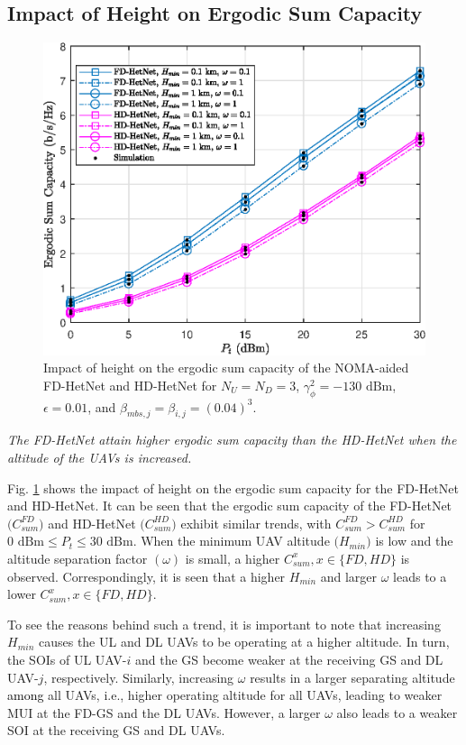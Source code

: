 \subsection{Impact of Height on Ergodic Sum Capacity}

\begin{figure}[h]
\centering \vspace{0.1cm}
\includegraphics [width=0.45\columnwidth]{chap7_fig/height_impact_sum_capacity.eps}
\caption{Impact of height on the ergodic sum capacity of the NOMA-aided FD-HetNet and HD-HetNet for $N_U = N_D = 3$, $\gamma_{\phi}^2 = -130\text{ dBm}$, $\epsilon = 0.01$, and $\beta_{mbs,j} = \beta_{i,j} = (0.04)^3$.}
\label{fig:NOMA_aided_multi_UAV_FD_HetNet_height_impact_sum_capacity}
\end{figure}

\begin{observation}
\emph{\emph{The FD-HetNet attain higher ergodic sum capacity than the HD-HetNet when the altitude of the UAVs is increased.}}
\end{observation}

Fig. \ref{fig:NOMA_aided_multi_UAV_FD_HetNet_height_impact_sum_capacity} shows the impact of height on the ergodic sum capacity for the FD-HetNet and HD-HetNet. It can be seen that the ergodic sum capacity of the FD-HetNet $\big(C_{sum}^{FD}\big)$ and HD-HetNet $\big(C_{sum}^{HD}\big)$ exhibit similar trends, with $C_{sum}^{FD} > C_{sum}^{HD}$ for $0\text{ dBm} \leq P_t \leq 30\text{ dBm}$. When the minimum UAV altitude $\big(H_{min}\big)$ is low and the altitude separation factor $(\omega)$ is small, a higher $C_{sum}^{x}, x \in \{FD, HD\}$ is observed. Correspondingly, it is seen that a higher $H_{min}$ and larger $\omega$ leads to a lower $C_{sum}^{x}, x \in \{FD, HD\}$. 

To see the reasons behind such a trend, it is important to note that increasing $H_{min}$ causes the UL and DL UAVs to be operating at a higher altitude. In turn, the SOIs of UL UAV-$i$ and the GS become weaker at the receiving GS and DL UAV-$j$, respectively. Similarly, increasing $\omega$ results in a larger separating altitude \textcolor{black}{among} all UAVs, i.e., higher operating altitude for all UAVs, leading to weaker MUI at the FD-GS and the DL UAVs. However, a larger $\omega$ also leads to a weaker SOI at the receiving GS and DL UAVs. 

